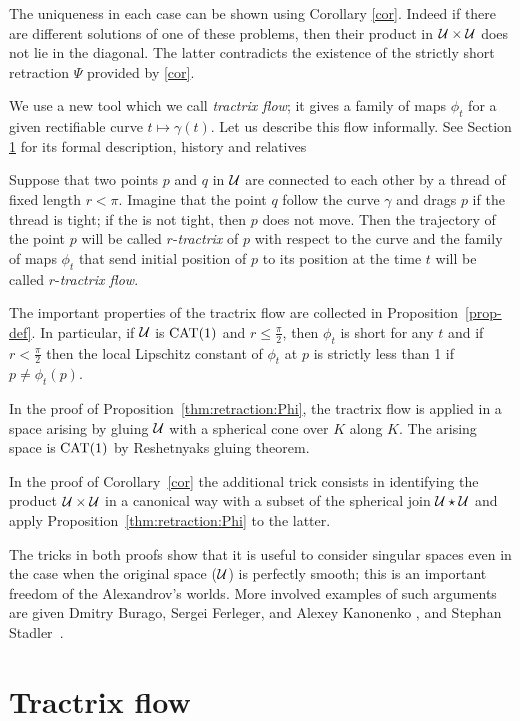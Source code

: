 \documentclass[oneside,a4paper, 12pt]{article}
\begin{document}
The uniqueness in each case can be shown using Corollary \ref{cor}.
Indeed if there are different solutions of one of these problems, then their product in ${\mathcal{U}}\times {\mathcal{U}}$ does not lie in the diagonal.
The latter contradicts the existence of the strictly short retraction $\Psi$ provided by \ref{cor}.

We use a new tool which we call \emph{tractrix flow}; it gives a family of maps $\phi_t$ for a given rectifiable curve $t\mapsto\gamma(t)$.
Let us describe this flow informally.
See Section \ref{sec:Tractrix flow} for its formal description, history and relatives

Suppose that two points $p$ and $q$ in ${\mathcal{U}}$ are connected to each other by a thread of fixed length $r<\pi$.
Imagine that the point $q$ follow the curve $\gamma$ and drags $p$ if the thread is tight; 
if the is not tight, then $p$ does not move.
Then the trajectory of the point $p$ will be called $r$-\emph{tractrix} of $p$ with respect to the curve
and the family of maps $\phi_t$ that send initial position of $p$ to its position at the time $t$ will be called $r$-\emph{tractrix flow}.

The important properties of the tractrix flow are collected in Proposition~\ref{prop-def}.
In particular, if $\mathcal{U}$ is $\mathrm{CAT}(1)$ and $r\le \tfrac\pi2$, then $\phi_t$ is short for any $t$ 
and if $r< \tfrac\pi2$ then the local Lipschitz constant of $\phi_t$ at $p$ is strictly less than 1 if $p\ne \phi_t(p)$.

In the proof of Proposition~\ref{thm:retraction:Phi}, the tractrix flow is applied in a space arising by gluing $\mathcal{U}$ with a spherical cone over $K$ along $K$.
The arising space is $\mathrm{CAT}(1)$ by Reshetnyaks gluing theorem.

In the proof of Corollary~\ref{cor} the additional trick consists in identifying the product $\mathcal{U}\times \mathcal{U}$ in a canonical way with a subset of the spherical join $\mathcal{U}\star \mathcal{U}$ and apply Proposition~\ref{thm:retraction:Phi} to the latter.

The tricks in both proofs show that it is useful to consider singular spaces even in the case when the original space ($\mathcal{U}$) is perfectly smooth;
this is an important freedom of the Alexandrov's worlds.
More involved examples of such arguments are given Dmitry Burago, Sergei Ferleger, and Alexey Kanonenko \cite{BFK}, and Stephan Stadler~\cite{stadler}.

\section{Tractrix flow}\label{sec:Tractrix flow}
\end{document}
